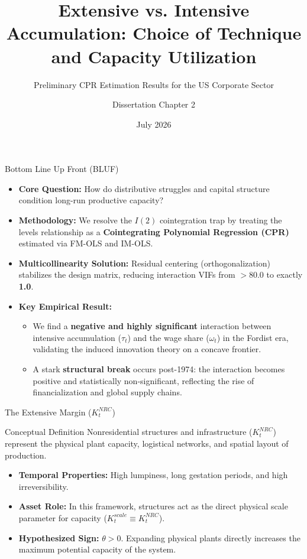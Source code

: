 \documentclass[10pt]{beamer}
\title[Extensive vs. Intensive Accumulation]{Extensive vs. Intensive Accumulation: Choice of Technique and Capacity Utilization}
\subtitle{Preliminary CPR Estimation Results for the US Corporate Sector}
\author{Dissertation Chapter 2}
\institute[UMass Amherst]{Department of Economics \\ University of Massachusetts Amherst}
\date{July 2026}
\begin{document}
\begin{frame}
  \titlepage
\end{frame}

\begin{frame}{Bottom Line Up Front (BLUF)}
  \begin{itemize}
    \item \textbf{Core Question:} How do distributive struggles and capital structure condition long-run productive capacity?
    \item \textbf{Methodology:} We resolve the $I(2)$ cointegration trap by treating the levels relationship as a \textbf{Cointegrating Polynomial Regression (CPR)} estimated via FM-OLS and IM-OLS. 
    \item \textbf{Multicollinearity Solution:} Residual centering (orthogonalization) stabilizes the design matrix, reducing interaction VIFs from $>80.0$ to exactly \textbf{1.0}.
    \item \textbf{Key Empirical Result:} 
      \begin{itemize}
        \item We find a \textbf{negative and highly significant} interaction between intensive accumulation ($\tau_t$) and the wage share ($\omega_t$) in the Fordist era, validating the induced innovation theory on a concave frontier.
        \item A stark \textbf{structural break} occurs post-1974: the interaction becomes positive and statistically non-significant, reflecting the rise of financialization and global supply chains.
      \end{itemize}
  \end{itemize}
\end{frame}

\begin{frame}{The Extensive Margin ($K^{NRC}_t$)}
  \begin{block}{Conceptual Definition}
    Nonresidential structures and infrastructure ($K^{NRC}_t$) represent the physical plant capacity, logistical networks, and spatial layout of production.
  \end{block}
  \begin{itemize}
    \item \textbf{Temporal Properties:} High lumpiness, long gestation periods, and high irreversibility.
    \item \textbf{Asset Role:} In this framework, structures act as the direct physical scale parameter for capacity ($K_t^{scale} \equiv K_t^{NRC}$).
    \item \textbf{Hypothesized Sign:} $\theta > 0$. Expanding physical plants directly increases the maximum potential capacity of the system.
  \end{itemize}
\end{frame}
\end{document}
